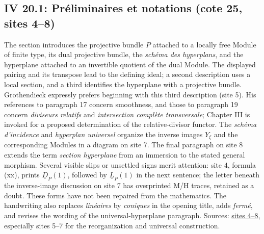 \documentclass[10pt,a4paper]{article}
\begin{document}
\par{}
\subsection*{IV 20.1: Préliminaires et notations (cote 25, sites 4--8)}
The section introduces the projective bundle $P$ attached to a locally free Module of finite type, its dual projective bundle, the \emph{schéma des hyperplans}, and the hyperplane attached to an invertible quotient of the dual Module. The displayed pairing and its transpose lead to the defining ideal; a second description uses a local section, and a third identifies the hyperplane with a projective bundle. Grothendieck expressly prefers beginning with this third description (site 5). His references to paragraph 17 concern smoothness, and those to paragraph 19 concern \emph{diviseurs relatifs} and \emph{intersection complète transversale}; Chapter III is invoked for a proposed determination of the relative-divisor functor. The \emph{schéma d'incidence} and \emph{hyperplan universel} organize the inverse images $Y_{\xi}$ and the corresponding Modules in a diagram on site 7. The final paragraph on site 8 extends the term \emph{section hyperplane} from an immersion to the stated general morphism. Several visible slips or unsettled signs merit attention: site 4, formula (xx), prints $\underline{D}_P(1)$, followed by $\underline{L}_P(1)$ in the next sentence; the letter beneath the inverse-image discussion on site 7 has overprinted M/H traces, retained as a doubt. These forms have not been repaired from the mathematics. The handwriting also replaces \emph{linéaires} by \emph{coniques} in the opening title, adds \emph{fermé}, and revises the wording of the universal-hyperplane paragraph. Sources: \href{https://grothendieck.umontpellier.fr/web/viewer.html?file=../25.pdf\#page=5}{sites 4--8}, especially sites 5--7 for the reorganization and universal construction.
\par{}

\par{}
\end{document}
